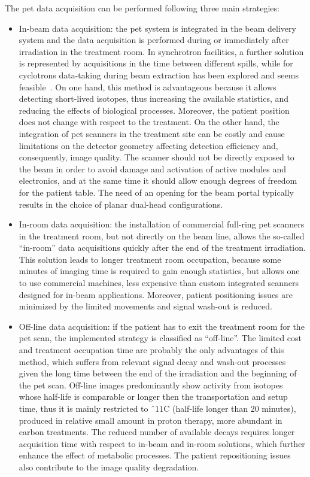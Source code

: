 The \gls{pet} data acquisition can be performed following three main strategies:
\begin{itemize}
\item In-beam data acquisition: the \gls{pet} system is integrated in the beam delivery system and the data acquisition is performed during or immediately after irradiation in the treatment room. In synchrotron facilities, a further solution is represented by acquisitions in the time between different spills, while for cyclotrons data-taking during beam extraction has been explored and seems feasible~\parencite{Kraan2014}. On one hand, this method is advantageous because it allows detecting short-lived isotopes, thus increasing the available statistics, and reducing the effects of biological processes. Moreover, the patient position does not change with respect to the treatment. On the other hand, the integration of \gls{pet} scanners in the treatment site can be costly and cause limitations on the detector geometry affecting detection efficiency and, consequently, image quality. The scanner should not be directly exposed to the beam in order to avoid damage and activation of active modules and electronics, and at the same time it should allow enough degrees of freedom for the patient table. The need of an opening for the beam portal typically results in the choice of planar dual-head configurations.
\item In-room data acquisition: the installation of commercial full-ring \gls{pet} scanners in the treatment room, but not directly on the beam line, allows the so-called \enquote{in-room} data acquisitions quickly after the end of the treatment irradiation. This solution leads to longer treatment room occupation, because some minutes of imaging time is required to gain enough statistics, but allows one to use commercial machines, less expensive than custom integrated scanners designed for in-beam applications. Moreover, patient positioning issues are minimized by the limited movements and signal wash-out is reduced.
\item Off-line data acquisition: if the patient has to exit the treatment room for the \gls{pet} scan, the implemented strategy is classified as \enquote{off-line}. The limited cost and treatment occupation time are probably the only advantages of this method, which suffers from relevant signal decay and wash-out processes given the long time between the end of the irradiation and the beginning of the \gls{pet} scan. Off-line images predominantly show activity from isotopes whose half-life is comparable or longer then the transportation and setup time, thus it is mainly restricted to $ˆ{11}$C (half-life longer than 20 minutes), produced in relative small amount in proton therapy, more abundant in carbon treatments. The reduced number of available decays requires longer acquisition time with respect to in-beam and in-room solutions, which further enhance the effect of metabolic processes. The patient repositioning issues also contribute to the image quality degradation. 
\end{itemize}
